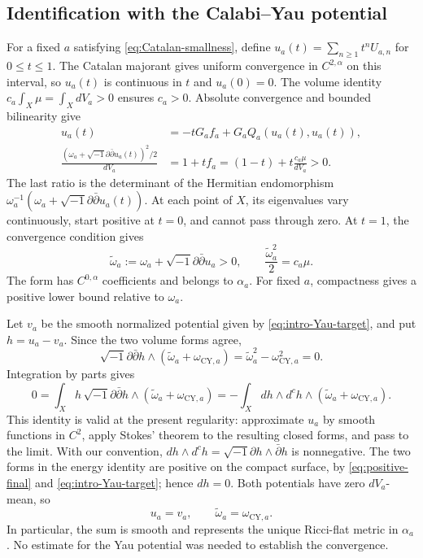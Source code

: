 \documentclass[11pt,a4paper,twoside]{article}
\numberwithin{equation}{section}
\newcommand{\ddc}{\sqrt{-1}\partial\bar\partial}
\theoremstyle{definition}
\theoremstyle{remark}
\newcommand{\ii}{\sqrt{-1}}
\begin{document}
\subsection{Identification with the Calabi--Yau potential}
\label{subsec:CY-identification}
For a fixed \(a\) satisfying \eqref{eq:Catalan-smallness}, define
\(u_a(t)=\sum_{n\ge1}t^nU_{a,n}\) for \(0\le t\le1\).
The Catalan majorant gives uniform convergence in \(C^{2,\alpha}\)
on this interval, so \(u_a(t)\) is continuous in \(t\) and
\(u_a(0)=0\). The volume identity
\(c_a\int_X\mu=\int_XdV_a>0\) ensures \(c_a>0\).
Absolute convergence and bounded bilinearity give
\[
\begin{aligned}
u_a(t)&=-tG_af_a+G_aQ_a(u_a(t),u_a(t)),\\
\frac{(\omega_a+\ddc u_a(t))^2/2}{dV_a}
&=1+tf_a=(1-t)+t\frac{c_a\mu}{dV_a}>0.
\end{aligned}
\]
The last ratio is the determinant of the Hermitian endomorphism
\(\omega_a^{-1}(\omega_a+\ddc u_a(t))\). At each point of \(X\),
its eigenvalues vary continuously, start positive at \(t=0\), and
cannot pass through zero. At \(t=1\), the convergence condition gives
\begin{equation}\label{eq:positive-final}
\widetilde\omega_a:=\omega_a+\ddc u_a>0,
\qquad \frac{\widetilde\omega_a^2}{2}=c_a\mu.
\end{equation}
The form has \(C^{0,\alpha}\) coefficients and belongs to
\(\alpha_a\). For fixed \(a\), compactness gives a positive
lower bound relative to \(\omega_a\).

Let \(v_a\) be the smooth normalized potential given by
\eqref{eq:intro-Yau-target}, and put \(h=u_a-v_a\). Since the
two volume forms agree,
\[
\ddc h\wedge(\widetilde\omega_a+\omega_{\mathrm{CY},a})
=\widetilde\omega_a^2-\omega_{\mathrm{CY},a}^2=0.
\]
Integration by parts gives
\[
0=\int_Xh\,\ddc h\wedge
(\widetilde\omega_a+\omega_{\mathrm{CY},a})
=-\int_Xdh\wedge d^ch\wedge
(\widetilde\omega_a+\omega_{\mathrm{CY},a}).
\]
This identity is valid at the present regularity: approximate
\(u_a\) by smooth functions in \(C^2\), apply Stokes' theorem
to the resulting closed forms, and pass to the limit. With our
convention, \(dh\wedge d^ch=\ii\partial h\wedge\bar\partial h\)
is nonnegative. The two forms in the energy identity are positive
on the compact surface, by \eqref{eq:positive-final} and
\eqref{eq:intro-Yau-target}; hence \(dh=0\).
Both potentials have zero \(dV_a\)-mean, so
\begin{equation}\label{eq:CY-identification}
u_a=v_a,
\qquad \widetilde\omega_a=\omega_{\mathrm{CY},a}.
\end{equation}
In particular, the sum is smooth and represents the unique
Ricci-flat metric in \(\alpha_a\). No estimate for the Yau
potential was needed to establish the convergence.
\end{document}
